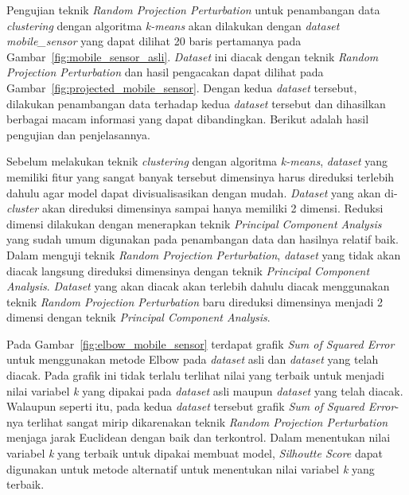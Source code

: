 Pengujian teknik \textit{Random Projection Perturbation} untuk penambangan data \textit{clustering} dengan algoritma \textit{k-means} akan dilakukan dengan \textit{dataset} \textit{mobile\_sensor} yang dapat dilihat 20 baris pertamanya pada Gambar~\ref{fig:mobile_sensor_asli}. \textit{Dataset} ini diacak dengan teknik \textit{Random Projection Perturbation} dan hasil pengacakan dapat dilihat pada Gambar~\ref{fig:projected_mobile_sensor}. Dengan kedua \textit{dataset} tersebut, dilakukan penambangan data terhadap kedua \textit{dataset} tersebut dan dihasilkan berbagai macam informasi yang dapat dibandingkan. Berikut adalah hasil pengujian dan penjelasannya.

Sebelum melakukan teknik \textit{clustering} dengan algoritma \textit{k-means}, \textit{dataset} yang memiliki fitur yang sangat banyak tersebut dimensinya harus direduksi terlebih dahulu agar model dapat divisualisasikan dengan mudah. \textit{Dataset} yang akan di-\textit{cluster} akan direduksi dimensinya sampai hanya memiliki 2 dimensi. Reduksi dimensi dilakukan dengan menerapkan teknik \textit{Principal Component Analysis} yang sudah umum digunakan pada penambangan data dan hasilnya relatif baik. Dalam menguji teknik \textit{Random Projection Perturbation}, \textit{dataset} yang tidak akan diacak langsung direduksi dimensinya dengan teknik \textit{Principal Component Analysis}. \textit{Dataset} yang akan diacak akan terlebih dahulu diacak menggunakan teknik \textit{Random Projection Perturbation} baru direduksi dimensinya menjadi 2 dimensi dengan teknik \textit{Principal Component Analysis}.

Pada Gambar~\ref{fig:elbow_mobile_sensor} terdapat grafik \textit{Sum of Squared Error} untuk menggunakan metode Elbow pada \textit{dataset} asli dan \textit{dataset} yang telah diacak. Pada grafik ini tidak terlalu terlihat nilai yang terbaik untuk menjadi nilai variabel \textit{k} yang dipakai pada \textit{dataset} asli maupun \textit{dataset} yang telah diacak. Walaupun seperti itu, pada kedua \textit{dataset} tersebut grafik \textit{Sum of Squared Error}-nya terlihat sangat mirip dikarenakan teknik \textit{Random Projection Perturbation} menjaga jarak Euclidean dengan baik dan terkontrol. Dalam menentukan nilai variabel \textit{k} yang terbaik untuk dipakai membuat model, \textit{Silhoutte Score} dapat digunakan untuk metode alternatif untuk menentukan nilai variabel \textit{k} yang terbaik.

